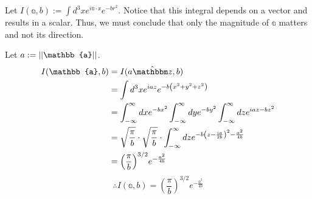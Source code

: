 \item

Let $I(\mathbb{a}, b) := \int d^3x e^{i\mathbb{a} \cdot \mathbb{x}} e^{-br^2}$.
Notice that this integral depends on a vector and results in a scalar.
Thus, we must conclude that only the magnitude of $\mathbb{a}$ matters and not its direction.

Let $a := \norm{\mathbb{a}}$.
\begin{align*}
	I(\mathbb{a}, b)
	&= I(a \zhat, b) \\
	&= \int d^3 x e^{iaz} e^{-b \left( x^2 + y^2 + z^2 \right)} \\
	&= \int_{-\infty}^{\infty} dx e^{-bx^2}
	   \int_{-\infty}^{\infty} dy e^{-by^2}
	   \int_{-\infty}^{\infty} dz e^{iaz - bz^2} \\
	&= \sqrt{\frac{\pi}{b}} \cdot \sqrt{\frac{\pi}{b}} \cdot
	   \int_{-\infty}^{\infty} dz e^{-b{\left( z - \frac{ia}{2b} \right)}^2 - \frac{a^2}{4b}} \\
	&= {\left( \frac{\pi}{b} \right)}^{3/2} e^{-\frac{a^2}{4b}}
\end{align*}
\[
	\therefore I(\mathbb{a}, b) = {\left( \frac{\pi}{b} \right)}^{3/2} e^{-\frac{\mathbb{a}^2}{4b}}
\]